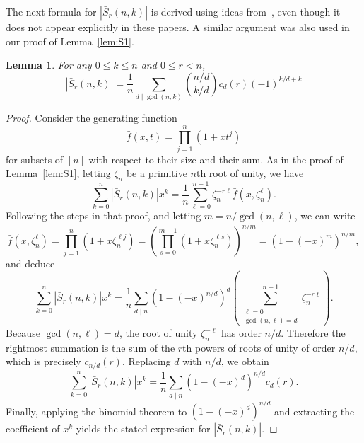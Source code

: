 \documentclass[12pt]{article}
\newcommand{\card}[1]{\left|#1\right|}
\newcommand{\nroot}{\zeta_n} %
\newcommand{\bS}{\bar{S}}
\newtheorem{lemma}[theorem]{Lemma}
\theoremstyle{definition}
\begin{document}
The next formula for $\card{\bS_r(n, k)}$ is derived using ideas from~\cite{subsetmodprime,jpl}, even though it does not appear explicitly in these papers. A similar argument was also used in our proof of Lemma~\ref{lem:S1}.

\begin{lemma}\label{lem:S'r}
    For any $0\le k\le n$ and $0\le r< n$, 
    \[
        \card{\bS_r(n, k)} = \frac{1}{n} \sum_{d \mid \gcd(n, k)} {n/d \choose k/d} c_d(r) (-1)^{k/d + k}
    \]
\end{lemma}

\begin{proof}
    Consider the generating function 
    \begin{equation*}
        \bar{f}(x,t) = \prod_{j = 1}^n (1 + x t^j)
    \end{equation*}
    for subsets of $[n]$ with respect to their size and their sum. As in the proof of Lemma~\ref{lem:S1}, letting $\nroot$ be a primitive $n$th root of unity, we have
    \begin{equation*}
        \sum_{k=0}^n \card{\bS_r(n, k)} x^k = \frac{1}{n} \sum_{\ell = 0}^{n-1} \nroot^{-r\ell} \bar{f}(x,\nroot^{\ell}).
    \end{equation*}
    Following the steps in that proof, and letting $m=n/\gcd(n,\ell)$, we can write
    $$\bar{f}(x,\nroot^\ell)=\prod_{j=1}^n(1+x\nroot^{\ell j})
    =\left(\prod_{s=0}^{m-1}(1+x\nroot^{\ell s})\right)^{n/m}=\left(1-(-x)^m\right)^{n/m},$$
    and deduce
    \begin{equation*}
        \sum_{k=0}^n \card{\bS_r(n, k)} x^k = \frac{1}{n} \sum_{d \mid n} \left(1 - (-x)^{n/d}\right)^d \left( \sum_{\substack{\ell = 0 \\ \gcd(n, \ell) = d}}^{n-1} \nroot^{-r\ell} \right).
    \end{equation*}
    Because $\gcd(n, \ell) = d$, the root of unity $\nroot^{-\ell}$ has order $n / d$.
    Therefore the rightmost summation is the sum of the $r$th powers of roots of
    unity of order $n / d$, which is precisely $c_{n/d}(r)$. Replacing $d$ with $n/d$, we obtain
    \begin{equation*}
        \sum_{k=0}^n \card{\bS_r(n, k)} x^k = \frac{1}{n} \sum_{d \mid n} \left(1 - (-x)^d\right)^{n/d} c_d(r).
    \end{equation*}
    Finally, applying the binomial theorem to $\left(1 - (-x)^d\right)^{n/d}$ and extracting the coefficient of $x^k$ yields the stated expression for $\card{\bS_r(n, k)}$.
\end{proof}
\end{document}

